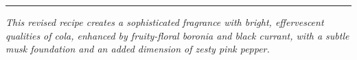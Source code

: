 \documentclass{article}
\begin{document}
\vspace{1cm}
\begin{center}
\textcolor{colaBrown}{\rule{0.8\textwidth}{0.4pt}}
\end{center}

\begin{center}
\textit{\textcolor{colaDark}{This revised recipe creates a sophisticated fragrance with bright,
effervescent qualities of cola, enhanced by fruity-floral boronia and black currant, 
with a subtle musk foundation and an added dimension of zesty pink pepper.}}
\end{center}
\end{document}
